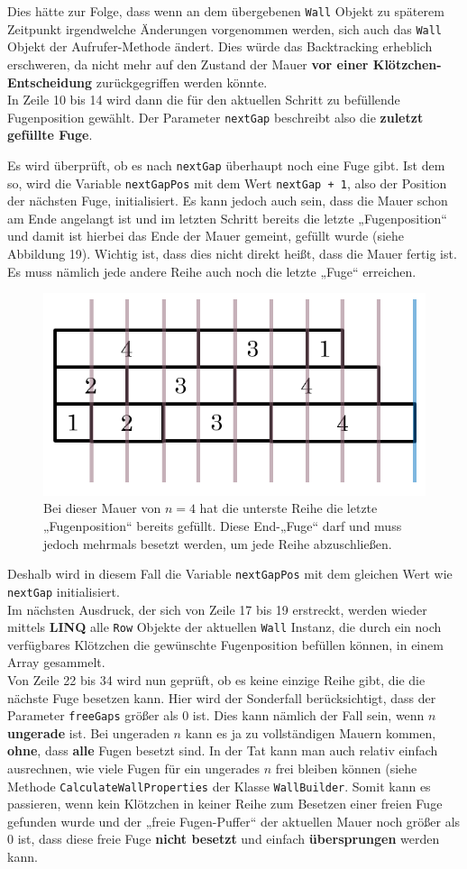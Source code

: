 \documentclass[a4paper,12pt]{article}
\newcommand{\code}{\texttt}
\begin{document}
Dies hätte zur Folge, dass wenn an dem übergebenen \code{Wall} Objekt zu späterem Zeitpunkt irgendwelche Änderungen vorgenommen werden, sich auch das \code{Wall} Objekt der Aufrufer-Methode ändert. Dies würde das Backtracking erheblich erschweren, da nicht mehr auf den Zustand der Mauer \textbf{vor einer Klötzchen-Entscheidung} zurückgegriffen werden könnte.
\\[0.4cm]
In Zeile 10 bis 14 wird dann die für den aktuellen Schritt zu befüllende Fugenposition gewählt. Der Parameter \code{nextGap} beschreibt also die \textbf{zuletzt gefüllte Fuge}.

Es wird überprüft, ob es nach \code{nextGap} überhaupt noch eine Fuge gibt. Ist dem so, wird die Variable \code{nextGapPos} mit dem Wert \code{nextGap + 1}, also der Position der nächsten Fuge, initialisiert. Es kann jedoch auch sein, dass die Mauer schon am Ende angelangt ist und im letzten Schritt bereits die letzte „Fugenposition“ und damit ist hierbei das Ende der Mauer gemeint, gefüllt wurde (siehe Abbildung 19). Wichtig ist, dass dies nicht direkt heißt, dass die Mauer fertig ist. Es muss nämlich jede andere Reihe auch noch die letzte „Fuge“ erreichen.
\begin{figure}[H]
    \centering
    \includegraphics[width=.6\linewidth]{Bilder/Aufgabe1/Code_Algorithmus_01.png}
    \caption{Bei dieser Mauer von $n = 4$ hat die unterste Reihe die letzte „Fugenposition“ bereits gefüllt. Diese End-„Fuge“ darf und muss jedoch mehrmals besetzt werden, um jede Reihe abzuschließen.}
\end{figure}
Deshalb wird in diesem Fall die Variable \code{nextGapPos} mit dem gleichen Wert wie \code{nextGap} initialisiert.
\\[0.4cm]
Im nächsten Ausdruck, der sich von Zeile 17 bis 19 erstreckt, werden wieder mittels \textbf{LINQ} alle \code{Row} Objekte der aktuellen \code{Wall} Instanz, die durch ein noch verfügbares Klötzchen die gewünschte Fugenposition befüllen können, in einem Array gesammelt.
\\[0.4cm]
Von Zeile 22 bis 34 wird nun geprüft, ob es keine einzige Reihe gibt, die die nächste Fuge besetzen kann. Hier wird der Sonderfall berücksichtigt, dass der Parameter \code{freeGaps} größer als 0 ist. Dies kann nämlich der Fall sein, wenn $n$ \textbf{ungerade} ist. Bei ungeraden $n$ kann es ja zu vollständigen Mauern kommen, \textbf{ohne}, dass \textbf{alle} Fugen besetzt sind. In der Tat kann man auch relativ einfach ausrechnen, wie viele Fugen für ein ungerades $n$ frei bleiben können (siehe Methode \code{CalculateWallProperties} der Klasse \code{WallBuilder}. Somit kann es passieren, wenn kein Klötzchen in keiner Reihe zum Besetzen einer freien Fuge gefunden wurde und der „freie Fugen-Puffer“ der aktuellen Mauer noch größer als 0 ist, dass diese freie Fuge \textbf{nicht besetzt} und einfach \textbf{übersprungen} werden kann.
\end{document}
